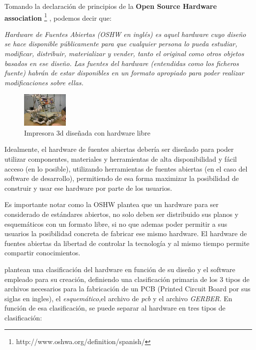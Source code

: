 Tomando la declaración de principios de la \textbf{Open Source Hardware association} \footnote{http://www.oshwa.org/definition/spanish/} , podemos decir que:

\begin{center}
\textit{
Hardware de Fuentes Abiertas (OSHW en inglés) es aquel hardware cuyo diseño se hace disponible públicamente para que cualquier persona lo pueda estudiar, modificar, distribuir, materializar y vender, tanto el original como otros objetos basados en ese diseño. Las fuentes del hardware (entendidas como los ficheros fuente) habrán de estar disponibles en un formato apropiado para poder realizar modificaciones sobre ellas.
}
\end{center}


\begin{figure}
  \begin{center}
    \includegraphics[width=0.2\textwidth]{figuras/reprap.jpg}
    \caption[Caption for LOF]{Impresora 3d diseñada con hardware libre}
       
    \label{fig:reprap }
  \end{center}
\end{figure}


Idealmente, el hardware de fuentes abiertas debería ser diseñado para poder utilizar componentes, materiales y herramientas de alta disponibilidad y fácil acceso (en lo posible), utilizando herramientas de fuentes abiertas (en el caso del software de desarrollo), permitiendo de esa forma maximizar la posibilidad de construir y usar ese hardware por parte de los usuarios. 

Es importante notar como la OSHW plantea que un hardware para ser considerado de estándares abiertos, no solo deben ser distribuido sus planos y esquemáticos con un formato libre, si no que ademas poder permitir a sus usuarios la posibilidad concreta de fabricar ese mismo hardware. El hardware de fuentes abiertas da libertad de controlar la tecnología y al mismo tiempo permite compartir conocimientos.

\citet{gonzalez_hardware_2003} plantean una clasificación del hardware en función de su diseño y el software empleado para su creación, definiendo una clasificación primaria de los 3 tipos de archivos necesarios para la fabricación de un PCB (Printed Circuit Board por sus siglas en ingles), el \textit{esquemático},el archivo de  \textit{pcb} y el archivo \textit{GERBER}. En función de esa clasificación, se puede separar al hardware en tres tipos de clasificación:

